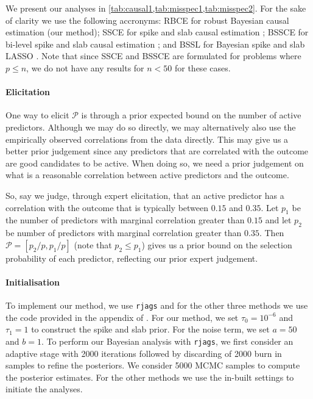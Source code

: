 \documentclass[preprint,12pt]{elsarticle}
\begin{document}
We present our analyses in \cref{tab:causal1,tab:misspec1,tab:misspec2}.
For the sake of clarity we use the following accronyms: RBCE for 
robust Bayesian causal estimation (our method); SSCE for spike and
slab causal estimation \citep{koch2020}; BSSCE for bi-level spike and slab causal
estimation \citep{koch2020}; and BSSL for Bayesian spike and slab LASSO
\citep{xu2015}. Note that since SSCE and BSSCE are formulated for problems
where $p\le n$, we do not have any results for $n<50$ for these cases.

\paragraph{Elicitation}
One way to elicit $\mathcal{P}$
is through a prior expected bound on the number of active predictors.
Although we may do so directly,
we may alternatively also use the empirically observed correlations from the data directly.
This may give us a better prior judgement since any predictors that are correlated with the outcome are good candidates to be active.
When doing so, we need a prior judgement on what is a reasonable correlation between active predictors and the outcome.

So, say we judge, through expert elicitation, that
an active predictor has a correlation with the outcome
that is typically between $0.15$ and $0.35$.
Let $p_1$ be the number of predictors with marginal correlation greater than $0.15$
and let $p_2$ be number of predictors with marginal 
correlation greater than $0.35$.
Then $\mathcal{P}=[p_2/p , p_1/p]$ (note that $p_2\le p_1$) gives us a prior bound on the selection probability of each predictor, reflecting our prior expert judgement.

\paragraph{Initialisation} 
To implement our method, we use \texttt{rjags} and for the other three
methods we use the code provided in the appendix of \citep{koch2020}.
For our method, we set $\tau_0=10^{-6}$ and $\tau_1=1$ to construct the
spike and slab prior.
For the noise term, we set $a=50$ and $b=1$.
To perform 
our Bayesian analysis with \texttt{rjags}, we first consider an adaptive 
stage with 2000 iterations followed by discarding of 2000 burn in samples 
to refine the posteriors. We consider 5000 MCMC samples to compute the
posterior estimates. For the other methods we use the in-built settings 
to initiate the analyses.
\end{document}
